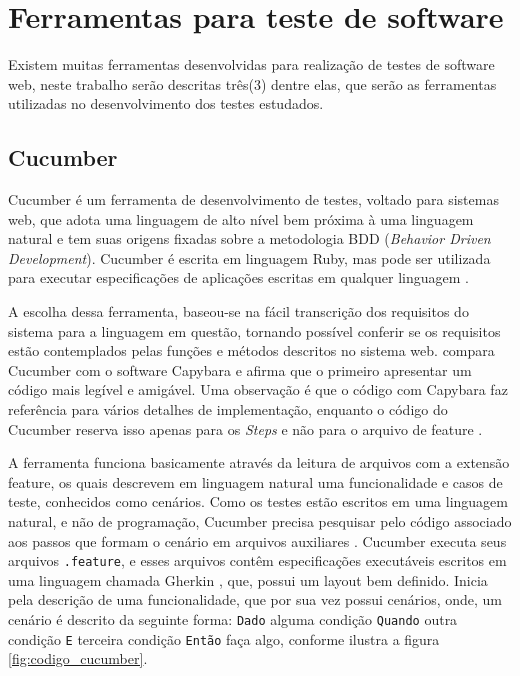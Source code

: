 \documentclass[tg]{mdtufsm}
\begin{document}
\section{Ferramentas para teste de software}
Existem muitas ferramentas desenvolvidas para realização de testes de software web, neste trabalho serão descritas três(3) dentre elas, que serão as ferramentas utilizadas no desenvolvimento dos testes estudados.

\subsection{Cucumber}
Cucumber é um ferramenta de desenvolvimento de testes, voltado para sistemas web, que adota uma linguagem de alto nível bem próxima à uma linguagem natural e tem suas origens fixadas sobre a metodologia BDD (\emph{Behavior Driven Development}). Cucumber
é escrita em linguagem Ruby, mas pode ser utilizada para executar especificações de aplicações escritas em qualquer linguagem \cite{nunescucumber}.

A escolha dessa ferramenta, baseou-se na fácil transcrição dos requisitos do sistema para a linguagem em questão, tornando possível conferir se os requisitos estão contemplados pelas funções e métodos descritos no sistema web.
\citeauthor{lopescucumbervalor}\cite{lopescucumbervalor} compara Cucumber com o software Capybara e afirma que o primeiro apresentar um código mais legível e amigável. Uma observação é que o código com Capybara faz
referência para vários detalhes de implementação, enquanto o código do Cucumber reserva isso apenas para os \emph{Steps} e não para o arquivo de feature \cite{lopescucumbervalor}.

A ferramenta funciona basicamente através da leitura de arquivos com a extensão feature, os quais descrevem em linguagem natural uma funcionalidade e casos de teste, conhecidos como cenários.
Como os testes estão escritos em uma linguagem natural, e não de programação, Cucumber precisa pesquisar pelo código associado aos passos que formam o cenário em arquivos auxiliares \cite{scmitzcucumberreview}. Cucumber
executa seus arquivos \texttt{.feature}, e esses arquivos contêm especificações executáveis escritos em uma linguagem chamada Gherkin \cite{cucumberwiki}, que, possui um layout bem definido. Inicia pela descrição de uma funcionalidade,
que por sua vez possui cenários, onde, um cenário é descrito da seguinte forma: \texttt{Dado} alguma condição \texttt{Quando} outra condição \texttt{E} terceira condição \texttt{Então} faça algo, conforme ilustra a figura \ref{fig:codigo_cucumber}.
\end{document}
